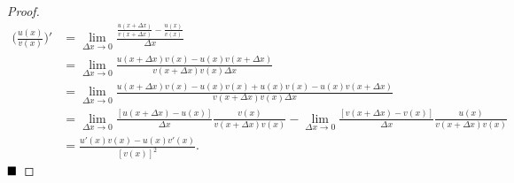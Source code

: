 \begin{proof}
	\begin{align*}
		\big(\frac{u(x)}{v(x)}\big)'&=\lim\limits_{\Delta x\to 0}\frac{\frac{u(x+\Delta x)}{v(x+\Delta x)}-\frac{u(x)}{v(x)}}{\Delta x}\\
		&=\lim\limits_{\Delta x\to 0}\frac{u(x+\Delta x)v(x)-u(x)v(x+\Delta x)}{v(x+\Delta x)v(x)\Delta x}\\
		&=\lim\limits_{\Delta x\to 0}\frac{u(x+\Delta x)v(x)-u(x)v(x)+u(x)v(x)-u(x)v(x+\Delta x)}{v(x+\Delta x)v(x)\Delta x}\\
		&=\lim\limits_{\Delta x\to 0}\frac{\left[u(x+\Delta x)-u(x)\right]}{\Delta x}\frac{v(x)}{v(x+\Delta x)v(x)}-\lim\limits_{\Delta x\to 0}\frac{\left[v(x+\Delta x)-v(x)\right]}{\Delta x}\frac{u(x)}{v(x+\Delta x)v(x)}\\
		&=\frac{u'(x)v(x)-u(x)v'(x)}{\left[v(x)\right]^2}.
	\end{align*}
	$\hfill\blacksquare$
\end{proof}
